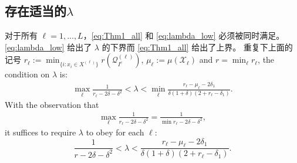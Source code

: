 \documentclass{ctexart}
\begin{document}
\subsection{存在适当的$\lambda$}\label{sec:exist_lambda}

对于所有 $\ell=1,...,L$，\eqref{eq:Thm1_all} 和 \eqref{eq:lambda_low}
必须被同时满足。 \eqref{eq:lambda_low} 给出了 $\lambda$ 的下界而 \eqref{eq:Thm1_all}
给出了上界。 重复下上面的记号 $r_{\ell}:=\min_{\{i: x_i\in X^{(\ell)}\}}r(\mathcal{Q}^{(\ell)}_{I^c})$,
$\mu_{\ell}:=\mu(\mathcal{X}_{\ell})$ and $r=\min_{\ell} r_{\ell}$, the condition on $\lambda$ is:
\begin{align*}
  \max_{\ell}\frac{1}{r_{\ell} - 2\delta-\delta^2}<\lambda < \min_{\ell}\frac{r_{\ell}-\mu_{\ell}-2\delta_1}{\delta(1+\delta)(2+r_{\ell}-\delta_1)}.
\end{align*}
With the observation that
\begin{align*}
\max_{\ell}\frac{1}{r_{\ell} - 2\delta-\delta^2}
= \frac{1}{\min r_{\ell} - 2\delta-\delta^2},
\end{align*}
it suffices to require $\lambda$ to obey for each $\ell$:
\begin{equation}\label{eq:lambda_range}
\frac{1}{r - 2\delta-\delta^2}<
        \lambda<\frac{r_{\ell}-\mu_{\ell}-2\delta_1}{\delta(1+\delta)(2+r_{\ell}-\delta_1)}.
\end{equation}




\end{document}
